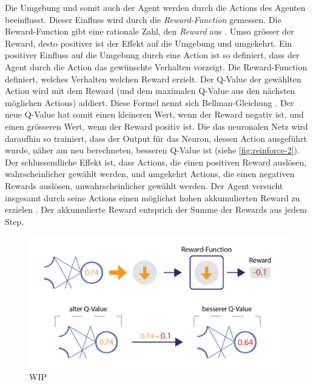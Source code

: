 Die Umgebung und somit auch der Agent werden durch die Actions des Agenten
beeinflusst. Dieser Einfluss wird durch die \emph{Reward-Function} gemessen. Die
Reward-Function gibt eine rationale Zahl, den \emph{Reward} aus \cite[S.
75]{sutton_reinforcement_2014}. Umso grösser der Reward, desto positiver ist der
Effekt auf die Umgebung und umgekehrt. Ein positiver Einfluss auf die Umgebung
durch eine Action ist so definiert, dass der Agent durch die Action das
gewünschte Verhalten vorzeigt. Die Reward-Function definiert, welches Verhalten
welchen Reward erzielt. Der Q-Value der gewählten Action wird mit dem Reward
(und dem maximalen Q-Value aus den nächsten möglichen Actions) addiert. Diese
Formel nennt sich Bellman-Gleichung \cite[S. 3]{mnih_playing_2013}. Der neue
Q-Value hat somit einen kleineren Wert, wenn der Reward negativ ist, und einen
grösseren Wert, wenn der Reward positiv ist. Die das neuronalen Netz wird
daraufhin so trainiert, dass der Output für das Neuron, dessen Action ausgeführt
wurde, näher am neu berechneten, besseren Q-Value ist (siehe \autoref{fig:reinforce-2}).
Der schlussendliche Effekt ist, dass Actions, die einen positiven Reward
auslösen, wahrscheinlicher gewählt werden, und umgekehrt Actions, die einen
negativen Rewards auslösen, unwahrscheinlicher gewählt werden. Der Agent
versucht insgesamt durch seine Actions einen möglichst hohen akkumulierten
Reward zu erzielen \cite[S. 57]{sutton_reinforcement_2014}. Der akkumulierte
Reward entsprich der Summe der Rewards aus jedem Step.

\begin{figure}[!ht]
    \centering
    \includegraphics[width=\textwidth]{images/theorie/reinforce-2.png}
    \caption{WIP}
    \label{fig:reinforce-2}
\end{figure}

